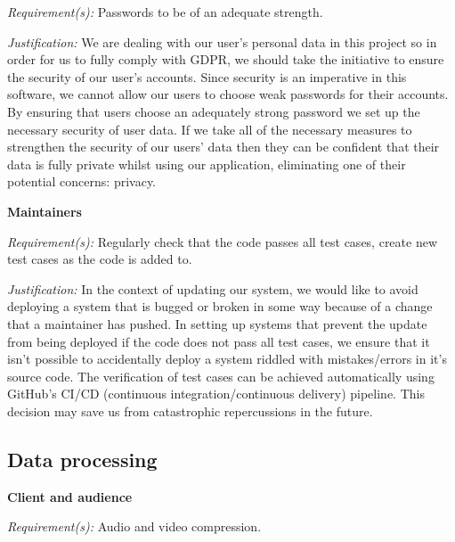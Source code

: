 \textit{Requirement(s):} Passwords to be of an adequate strength.
\\ \vspace{0.1cm}

\textit{Justification:}
We are dealing with our user's personal data in this project
so in order for us to fully comply with GDPR, we should 
take the initiative to ensure the security of our user's
accounts. Since security is an imperative in this software,
we cannot allow our users to choose weak passwords
for their accounts. By ensuring that users choose an
adequately strong password we set up the necessary
security of user data. If we take all of the necessary
measures to strengthen the security of our users’ data 
then they can be confident that their data is fully
private whilst using our application, eliminating
one of their potential concerns: privacy.
\\ \vspace{0.2cm}

\textsf{\bfseries Maintainers} \\ \vspace{0.1cm}

\textit{Requirement(s):} Regularly check that the code passes 
all test cases, create new test cases as the code is added to.
\\ \vspace{0.1cm}

\textit{Justification:}
In the context of updating our system, we would like to avoid
deploying a system that is bugged or broken in some way 
because of a change that a maintainer has pushed. In setting 
up systems that prevent the update from being deployed if the 
code does not pass all test cases, we ensure that it isn't 
possible to accidentally deploy a system riddled with 
mistakes/errors in it's source code. The verification of
test cases can be achieved automatically
using GitHub's CI/CD (continuous integration/continuous 
delivery) pipeline. This decision may save us from 
catastrophic repercussions in the future. 

\subsection{Data processing}

\textsf{\bfseries Client and audience} \\ \vspace{0.1cm}

\textit{Requirement(s):} Audio and video compression. \\ \vspace{0.1cm}

